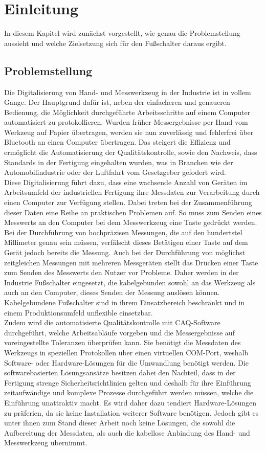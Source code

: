 \section{Einleitung}
In diesem Kapitel wird zunächst vorgestellt, wie genau die Problemstellung aussieht und welche Zielsetzung sich für den Fußschalter daraus ergibt.

\subsection{Problemstellung}
Die Digitalisierung von Hand- und Messwerkzeug in der Industrie ist in vollem Gange. Der Hauptgrund dafür ist, neben der einfacheren und genaueren Bedienung, die Möglichkeit durchgeführte Arbeitsschritte auf einem Computer automatisiert zu protokollieren. Wurden früher Messergebnisse per Hand vom Werkzeug auf Papier übertragen, werden sie nun zuverlässig und fehlerfrei über Bluetooth an einen Computer übertragen. Das steigert die Effizienz und ermöglicht die Automatisierung der Qualitätskontrolle, sowie den Nachweis, dass Standards in der Fertigung eingehalten wurden, was in Branchen wie der Automobilindustrie oder der Luftfahrt vom Gesetzgeber gefodert wird.\\
Diese Digitalisierung führt dazu, dass eine wachsende Anzahl von Geräten im Arbeitsumfeld der industriellen Fertigung ihre Messdaten zur Verarbeitung durch einen Computer zur Verfügung stellen. Dabei treten bei der Zusammenführung dieser Daten eine Reihe an praktischen Problemen auf. So muss zum Senden eines Messwerts an den Computer bei dem Messwerkzeug eine Taste gedrückt werden. Bei der Durchführung von hochpräzisen Messungen, die auf den hundertstel Millimeter genau sein müssen, verfälscht dieses Betätigen einer Taste auf dem Gerät jedoch bereits die Messung. Auch bei der Durchführung von möglichst zeitgleichen Messungen mit mehreren Messgeräten stellt das Drücken einer Taste zum Senden des Messwerts den Nutzer vor Probleme. Daher werden in der Industrie Fußschalter eingesetzt, die kabelgebunden sowohl an das Werkzeug als auch an den Computer, dieses Senden der Messung auslösen können. Kabelgebundene Fußschalter sind in ihrem Einsatzbereich beschränkt und in einem Produktionsumfeld unflexible einsetzbar.\\
Zudem wird die automatisierte Qualitätskontrolle mit \ac{CAQ}-Software durchgeführt, welche Arbeitsabläufe vorgeben und die Messergebnisse auf voreingestellte Toleranzen überprüfen kann. Sie benötigt die Messdaten des Werkzeugs in speziellen Protokollen über einen virtuellen COM-Port, weshalb Software- oder Hardware-Lösungen für die Umwandlung benötigt werden. Die softwarebasierten Lösungsansätze besitzen dabei den Nachteil, dass in der Fertigung strenge Sicherheitsrichtlinien gelten und deshalb für ihre Einführung zeitaufwändige und komplexe Prozesse durchgeführt werden müssen, welche die Einführung unattraktiv macht. Es wird daher dazu tendiert Hardware-Lösungen zu präferien, da sie keine Installation weiterer Software benötigen. Jedoch gibt es unter ihnen zum Stand dieser Arbeit noch keine Lösungen, die sowohl die Aufbereitung der Messdaten, als auch die kabellose Anbindung des Hand- und Messwerkzeug übernimmt.\\
